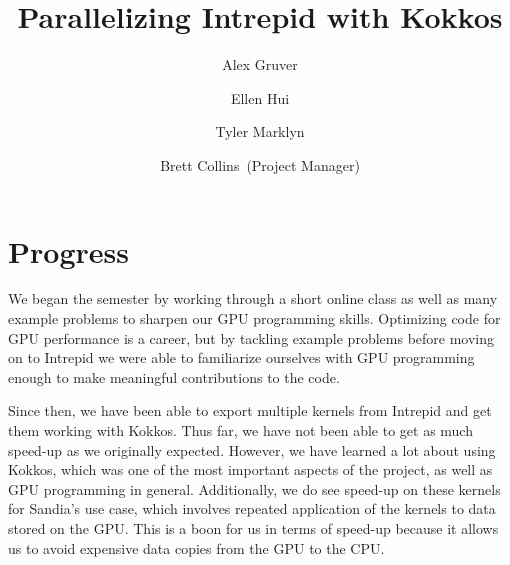 \documentclass{hmcclinic}
\title{Parallelizing Intrepid with Kokkos}
\author{Alex Gruver \and Ellen Hui \and Tyler Marklyn \and Brett Collins~(Project Manager)}
\begin{document}





\maketitle

\mainmatter




\section*{Progress}
We began the semester by working through a short online class as well as many example
problems to sharpen our GPU programming skills. Optimizing code for GPU
performance is a career, but by tackling example problems before moving on to
Intrepid we were able to familiarize ourselves with GPU programming enough to
make meaningful contributions to the code.

Since then, we have been able to export multiple kernels from Intrepid and get
them working with Kokkos. Thus far, we have not been able to get as much speed-up as we
originally expected. However, we have learned a lot about using
Kokkos, which was one of the most important aspects of the project, as well as
GPU programming in general. Additionally, we do see speed-up on these kernels
for Sandia's use case, which involves repeated application of the kernels to
data stored on the GPU. This is a boon for us in terms of speed-up because it
allows us to avoid expensive data copies from the GPU to the CPU.
\end{document}
